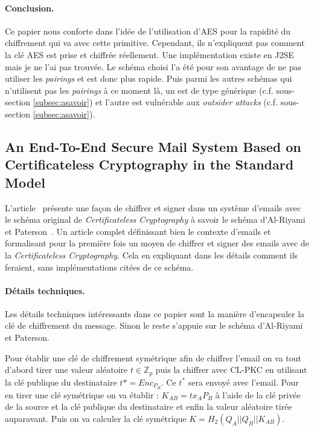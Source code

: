 \paragraph*{Conclusion.} Ce papier nous conforte dans l'idée de l'utilisation d'AES pour la rapidité du chiffrement qui va avec cette primitive. Cependant, ils n'expliquent pas comment la clé AES est prise et chiffrée réellement. Une implémentation existe en J2SE mais je ne l'ai pas trouvée. Le schéma choisi l'a été pour son avantage de ne pas utiliser les \textit{pairings} et est donc plus rapide. Puis parmi les autres schémas qui n'utilisent pas les \textit{pairings} à ce moment là, un est de type générique (c.f. sous-section \ref{subsec:asavoir}) et l'autre est vulnérable aux \textit{outsider attacks} (c.f. sous-section \ref{subsec:asavoir}).

\subsection{An End-To-End Secure Mail System Based on Certificateless Cryptography in the Standard Model}
L'article~\cite{endToEndSecureEmailArticle} présente une façon de chiffrer et signer dans un système d'emails avec le schéma original de \textit{Certificateless Cryptography} à savoir le schéma d'Al-Riyami et Paterson~\cite{conf/asiacrypt/Al-RiyamiP03}. Un article complet définissant bien le contexte d'emails et formalisant pour la première fois un moyen de chiffrer et signer des emails avec de la \textit{Certificateless Cryptography}. Cela en expliquant dans les détails comment ils feraient, sans implémentations citées de ce schéma.
\paragraph*{Détails techniques.} Les détails techniques intéressants dans ce papier sont la manière d'encapsuler la clé de chiffrement du message. Sinon le reste s'appuie sur le schéma d'Al-Riyami et Paterson.

Pour établir une clé de chiffrement symétrique afin de chiffrer l'email on va tout d'abord tirer une valeur aléatoire $t \in \mathbb{Z}_p$ puis la chiffrer avec CL-PKC en utilisant la clé publique du destinataire $t* = Enc_{P_B}$. Ce $t^*$ sera envoyé avec l'email. Pour en tirer une clé symétrique on va établir : $K_{AB} = tx_AP_B$ à l'aide de la clé privée de la source et la clé publique du destinataire et enfin la valeur aléatoire tirée auparavant. Puis on va calculer la clé symétrique $K = H_2(Q_A||Q_B||K_{AB})$.
